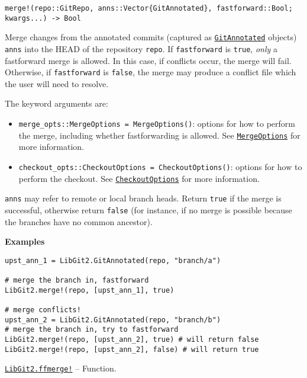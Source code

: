 \begin{adjustwidth}{2em}{0pt}


\begin{verbatim}
merge!(repo::GitRepo, anns::Vector{GitAnnotated}, fastforward::Bool; kwargs...) -> Bool
\end{verbatim}

Merge changes from the annotated commits (captured as \hyperlink{9263689983564368210}{\texttt{GitAnnotated}} objects) \texttt{anns} into the HEAD of the repository \texttt{repo}. If \texttt{fastforward} is \texttt{true}, \emph{only} a fastforward merge is allowed. In this case, if conflicts occur, the merge will fail. Otherwise, if \texttt{fastforward} is \texttt{false}, the merge may produce a conflict file which the user will need to resolve.

The keyword arguments are:

\begin{itemize}
\item \texttt{merge\_opts::MergeOptions = MergeOptions()}: options for how to perform the merge, including whether fastforwarding is allowed. See \hyperlink{7663922722360889557}{\texttt{MergeOptions}} for more information.


\item \texttt{checkout\_opts::CheckoutOptions = CheckoutOptions()}: options for how to perform the checkout. See \hyperlink{16441061243067746546}{\texttt{CheckoutOptions}} for more information.

\end{itemize}
\texttt{anns} may refer to remote or local branch heads. Return \texttt{true} if the merge is successful, otherwise return \texttt{false} (for instance, if no merge is possible because the branches have no common ancestor).

\textbf{Examples}


\begin{verbatim}
upst_ann_1 = LibGit2.GitAnnotated(repo, "branch/a")

# merge the branch in, fastforward
LibGit2.merge!(repo, [upst_ann_1], true)

# merge conflicts!
upst_ann_2 = LibGit2.GitAnnotated(repo, "branch/b")
# merge the branch in, try to fastforward
LibGit2.merge!(repo, [upst_ann_2], true) # will return false
LibGit2.merge!(repo, [upst_ann_2], false) # will return true
\end{verbatim}



\end{adjustwidth}
\hypertarget{12324560892659859842}{}
\hyperlink{12324560892659859842}{\texttt{LibGit2.ffmerge!}}  -- {Function.}

